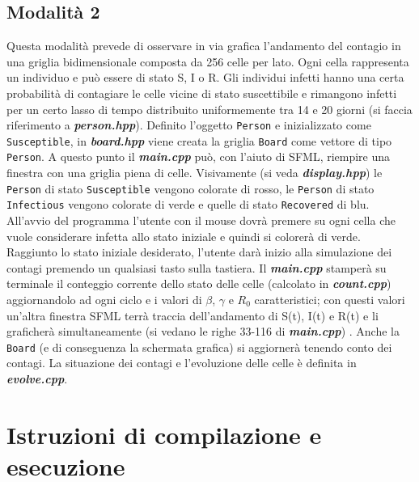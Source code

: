 \documentclass[a4paper,10 pt]{article}
\begin{document}
\subsection{Modalità 2}
Questa modalità prevede di osservare in via grafica l'andamento del contagio in una griglia bidimensionale composta da 256 celle per lato. Ogni cella rappresenta un individuo e può essere di stato S, I o R. Gli individui infetti hanno una certa probabilità di contagiare le celle vicine di stato suscettibile e rimangono infetti per un certo lasso di tempo distribuito uniformemente tra 14 e 20 giorni (si faccia riferimento a \textbf{\textit{person.hpp}}). Definito l'oggetto \verb!Person! e inizializzato come \verb!Susceptible!, in \textbf{\textit{board.hpp}} viene creata la griglia \verb!Board! come vettore di tipo  \verb!Person!. A questo punto il \textbf{\textit{main.cpp}} può, con l'aiuto di SFML, riempire una finestra con una griglia piena di celle. Visivamente (si veda  \textbf{\textit{display.hpp}}) le \verb!Person! di stato \verb!Susceptible! vengono colorate di rosso, le \verb!Person! di stato \verb!Infectious! vengono colorate di verde e quelle di stato \verb!Recovered! di blu.
\ \\
All'avvio del programma l'utente con il mouse dovrà premere su ogni cella che vuole considerare infetta allo stato iniziale e quindi si colorerà di verde. Raggiunto lo stato iniziale desiderato, l'utente darà inizio alla simulazione dei contagi premendo un qualsiasi tasto sulla tastiera. Il \textbf{\textit{main.cpp}} stamperà su terminale il conteggio corrente dello stato delle celle (calcolato in \textbf{\textit{count.cpp}}) aggiornandolo ad ogni ciclo e i valori di $\beta$, $\gamma$ e $R_0$ caratteristici; con questi valori un'altra finestra SFML terrà traccia dell'andamento di S(t), I(t) e R(t) e li graficherà simultaneamente (si vedano le righe 33-116 di \textbf{\textit{main.cpp}}) . Anche la \verb!Board! (e di conseguenza la schermata grafica) si aggiornerà tenendo conto dei contagi. La situazione dei contagi e l'evoluzione delle celle è definita in \textbf{\textit{evolve.cpp}}.

\section{Istruzioni di compilazione e esecuzione}
\end{document}
